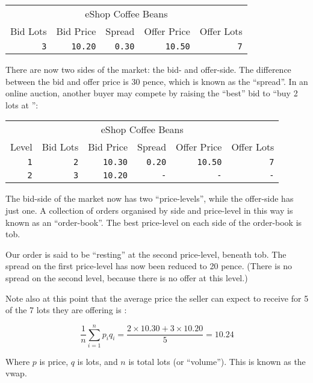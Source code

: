 \documentclass[11pt,a4paper]{article}
\newcommand{\s}{\textsterling}
\begin{document}
\vspace{5mm}
\begin{tabular}{rrrrr}
\multicolumn{5}{c}{eShop Coffee Beans}\\
Bid Lots&Bid Price&Spread&Offer Price&Offer Lots\\
\hline
\texttt{3}&\texttt{10.20}&\texttt{0.30}&\texttt{10.50}&\texttt{7}\\
\end{tabular}
\vspace{5mm}

There are now two sides of the \gls{market}: the \gls{bid}- and \gls{offer}-side. The difference
between the \gls{bid} and \gls{offer} price is 30 pence, which is known as the ``\gls{spread}''. In
an online \gls{auction}, another buyer may compete by raising the ``best'' \gls{bid} to ``buy 2
\glspl{lot} at \s10.30'':

\vspace{5mm}
\begin{tabular}{r|rrrrr}
\multicolumn{6}{c}{eShop Coffee Beans}\\
Level&Bid Lots&Bid Price&Spread&Offer Price&Offer Lots\\
\hline
\texttt{1}&\texttt{2}&\texttt{10.30}&\texttt{0.20}&\texttt{10.50}&\texttt{7}\\
\texttt{2}&\texttt{3}&\texttt{10.20}&\texttt{-}&\texttt{-}&\texttt{-}\\
\end{tabular}
\vspace{5mm}

The \gls{bid}-side of the \gls{market} now has two ``\glspl{price-level}'', while the
\gls{offer}-side has just one. A collection of \glspl{order} organised by side and \gls{price-level}
in this way is known as an ``\gls{order-book}''. The best \gls{price-level} on each side of the
\gls{order-book} is \gls{tob}.

Our \gls{order} is said to be ``resting'' at the second \gls{price-level}, beneath \gls{tob}. The
\gls{spread} on the first \gls{price-level} has now been reduced to 20 pence. (There is no
\gls{spread} on the second level, because there is no \gls{offer} at this level.)

Note also at this point that the average price the seller can expect to receive for 5 of the 7
\glspl{lot} they are offering is \s10.24:

\[
\frac{1}{n}\sum_{i=1}^{n}p_iq_i = \frac{2\times10.30+3\times10.20}{5} = 10.24
\]

Where $p$ is price, $q$ is \glspl{lot}, and $n$ is total \glspl{lot} (or ``\gls{volume}''). This is
known as the \gls{vwap}.
\end{document}
